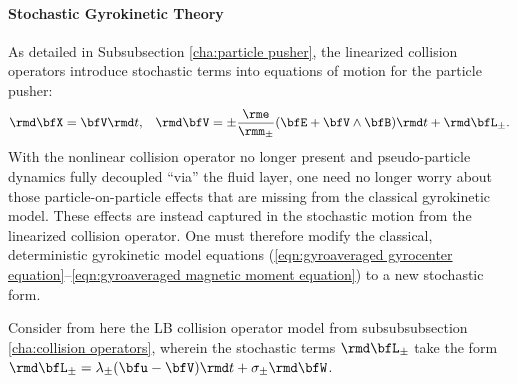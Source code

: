 \paragraph*{Stochastic Gyrokinetic Theory}
    As detailed in Subsubsection \ref{cha:particle pusher}, the linearized collision operators introduce stochastic terms into equations of motion for the particle pusher:
    \begin{align}
        \rmd\bfX  =  \bfV\rmd t,  &&
        \rmd\bfV  =  \pm\frac{\rme}{\rmm_{\pm}}(\bfE + \bfV\wedge\bfB)\rmd t + \rmd\bfL_{\pm}.
    \end{align}
    With the nonlinear collision operator no longer present and pseudo-particle dynamics fully decoupled ``via'' the fluid layer, one need no longer worry about those particle-on-particle effects that are missing from the classical gyrokinetic model. These effects are instead captured in the stochastic motion from the linearized collision operator. One must therefore modify the classical, deterministic gyrokinetic model equations (\ref{eqn:gyroaveraged gyrocenter equation}--\ref{eqn:gyroaveraged magnetic moment equation}) to a new stochastic form.

    Consider from here the LB collision operator model from subsubsubsection \ref{cha:collision operators}, wherein the stochastic terms $\rmd\bfL_{\pm}$ take the form $\rmd\bfL_{\pm}  =  \lambda_{\pm}(\bfu - \bfV)\rmd t + \sigma_{\pm}\rmd\bfW$.
    
